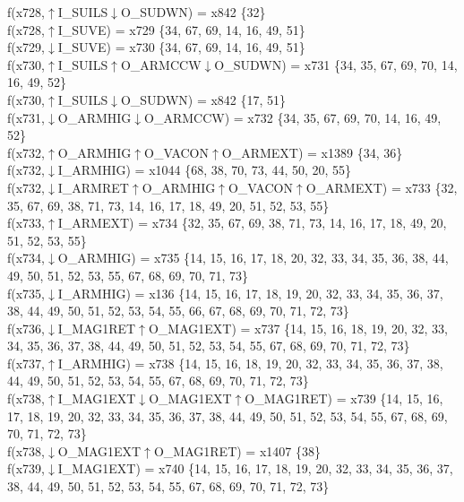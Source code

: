 f(x728,$\uparrow$I\_SUILS$\downarrow$O\_SUDWN) = x842 \{32\} \\  
f(x728,$\uparrow$I\_SUVE) = x729 \{34, 67, 69, 14, 16, 49, 51\} \\  
f(x729,$\downarrow$I\_SUVE) = x730 \{34, 67, 69, 14, 16, 49, 51\} \\  
f(x730,$\uparrow$I\_SUILS$\uparrow$O\_ARMCCW$\downarrow$O\_SUDWN) = x731 \{34, 35, 67, 69, 70, 14, 16, 49, 52\} \\  
f(x730,$\uparrow$I\_SUILS$\downarrow$O\_SUDWN) = x842 \{17, 51\} \\  
f(x731,$\downarrow$O\_ARMHIG$\downarrow$O\_ARMCCW) = x732 \{34, 35, 67, 69, 70, 14, 16, 49, 52\} \\  
f(x732,$\uparrow$O\_ARMHIG$\uparrow$O\_VACON$\uparrow$O\_ARMEXT) = x1389 \{34, 36\} \\  
f(x732,$\downarrow$I\_ARMHIG) = x1044 \{68, 38, 70, 73, 44, 50, 20, 55\} \\  
f(x732,$\downarrow$I\_ARMRET$\uparrow$O\_ARMHIG$\uparrow$O\_VACON$\uparrow$O\_ARMEXT) = x733 \{32, 35, 67, 69, 38, 71, 73, 14, 16, 17, 18, 49, 20, 51, 52, 53, 55\} \\  
f(x733,$\uparrow$I\_ARMEXT) = x734 \{32, 35, 67, 69, 38, 71, 73, 14, 16, 17, 18, 49, 20, 51, 52, 53, 55\} \\  
f(x734,$\downarrow$O\_ARMHIG) = x735 \{14, 15, 16, 17, 18, 20, 32, 33, 34, 35, 36, 38, 44, 49, 50, 51, 52, 53, 55, 67, 68, 69, 70, 71, 73\} \\  
f(x735,$\downarrow$I\_ARMHIG) = x136 \{14, 15, 16, 17, 18, 19, 20, 32, 33, 34, 35, 36, 37, 38, 44, 49, 50, 51, 52, 53, 54, 55, 66, 67, 68, 69, 70, 71, 72, 73\} \\  
f(x736,$\downarrow$I\_MAG1RET$\uparrow$O\_MAG1EXT) = x737 \{14, 15, 16, 18, 19, 20, 32, 33, 34, 35, 36, 37, 38, 44, 49, 50, 51, 52, 53, 54, 55, 67, 68, 69, 70, 71, 72, 73\} \\  
f(x737,$\uparrow$I\_ARMHIG) = x738 \{14, 15, 16, 18, 19, 20, 32, 33, 34, 35, 36, 37, 38, 44, 49, 50, 51, 52, 53, 54, 55, 67, 68, 69, 70, 71, 72, 73\} \\  
f(x738,$\uparrow$I\_MAG1EXT$\downarrow$O\_MAG1EXT$\uparrow$O\_MAG1RET) = x739 \{14, 15, 16, 17, 18, 19, 20, 32, 33, 34, 35, 36, 37, 38, 44, 49, 50, 51, 52, 53, 54, 55, 67, 68, 69, 70, 71, 72, 73\} \\  
f(x738,$\downarrow$O\_MAG1EXT$\uparrow$O\_MAG1RET) = x1407 \{38\} \\  
f(x739,$\downarrow$I\_MAG1EXT) = x740 \{14, 15, 16, 17, 18, 19, 20, 32, 33, 34, 35, 36, 37, 38, 44, 49, 50, 51, 52, 53, 54, 55, 67, 68, 69, 70, 71, 72, 73\} \\  
